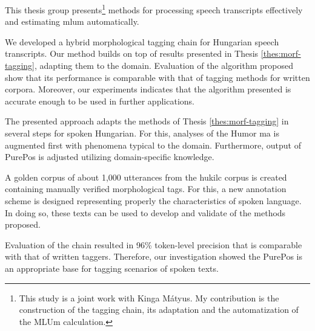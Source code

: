This thesis group presents\footnote{This study is a joint work with Kinga Mátyus. 
My contribution is the construction of the tagging chain, its adaptation and the automatization of the MLUm calculation.} methods for processing speech transcripts effectively and estimating \acrlong{mlum} automatically.

\begin{core}
\begin{thesis}
\label{thes:spoken-morf-tagging}
We developed a hybrid morphological tagging chain for Hungarian speech transcripts.
Our method builds on top of results presented in Thesis \ref{thes:morf-tagging}, adapting them to the domain.
Evaluation of the algorithm proposed show that its performance is comparable with that of tagging methods for written corpora.
Moreover, our experiments indicates that the algorithm presented is accurate enough to be used in further applications.
\end{thesis}

\begin{pub}
\cite{Matyus2014,Orosz2014c}
\end{pub}
\end{core}

The presented approach adapts the methods of Thesis \ref{thes:morf-tagging} in several steps for spoken Hungarian.
For this, analyses of the Humor \acrlong{ma} is augmented first with phenomena typical to the domain.
Furthermore, output of PurePos is adjusted utilizing domain-specific knowledge.

A golden corpus of about 1,000 utterances from the \acrshort{hukilc} corpus is created containing manually verified morphological tags. 
For this, a new annotation scheme is designed representing properly the characteristics of spoken language.
In doing so, these texts can be used to develop and validate of the methods proposed.

Evaluation of the chain resulted in 96\% token-level precision that is comparable with that of written taggers.
Therefore, our investigation showed the PurePos is an appropriate base for tagging scenarios of spoken texts.

\thesisline%


